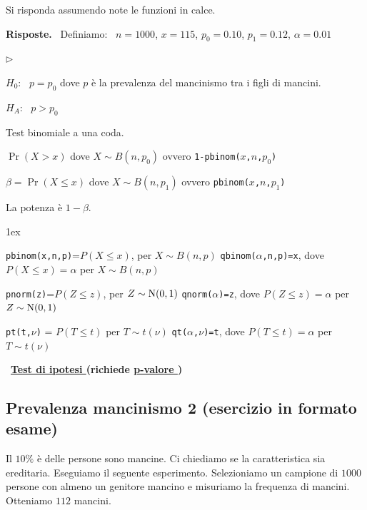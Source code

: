 \documentclass[11pt,openany]{book}
\newcommand{\mylabel}[1]{{\footnotesize\textsf{#1}}\hfill}
\renewenvironment{itemize}
  {\begin{list}{$\triangleright$}{%
   \setlength{\parskip}{0mm}
   \setlength{\topsep}{.2\baselineskip}
   \setlength{\rightmargin}{0mm}
   \setlength{\listparindent}{0mm}
   \setlength{\itemindent}{0mm}
   \setlength{\labelwidth}{3ex}
   \setlength{\itemsep}{.4\baselineskip}
   \setlength{\parsep}{0mm}
   \setlength{\partopsep}{0mm}
   \setlength{\labelsep}{1ex}
   \setlength{\leftmargin}{\labelwidth+\labelsep}
   \let\makelabel\mylabel}}{%
   \end{list}\vspace*{-1.3mm}}
\begin{document}
Si risponda assumendo note le funzioni in calce.

\textbf{Risposte.} \ Definiamo: \ $n=1000$,\hfil
$x=115$,\hfil
$p_0=0.10$,\hfil
$p_1=0.12$,\hfil
$\alpha=0.01$\hfil

\begin{itemize}
\item[1.] $H_0$: \ $p=p_0$ dove $p$ è la prevalenza del mancinismo tra i figli di mancini.
\item[2.] $H_A$: \ $p>p_0$ 
\item[3.] Test binomiale a una coda.
\item[4.] $\Pr(X> x)$ dove $X\sim B(n,p_0)$ ovvero {\tt 1-pbinom($x$,$n$,$p_0$)}
\item[5.] $\beta=\Pr(X\le x)$ dove $X\sim B(n,p_1)$ ovvero {\tt pbinom($x$,$n$,$p_1$)}
\item[6.]  La potenza è $1-\beta$.
\end{itemize}


\vfill
\parskip1ex
{\hrulefill\scriptsize

{\tt pbinom(x,n,p)}=$P(X\le x)$, per $X\sim B(n,p)$
\hfill 
{\tt qbinom($\alpha$,n,p)=x},  dove $P(X\le x)=\alpha$ per $X\sim B(n,p)$

{\tt pnorm(z)}=$P(Z\le z)$, per $Z\sim {\rm N}(0,1)$
\hfill 
{\tt qnorm($\alpha$)=z},  dove $P(Z\le z)=\alpha$ per $Z\sim {\rm N}(0,1)$

{\tt pt(t,$\nu$)} = $P(T\le t)$ per $T\sim t(\nu)$
\hfill
{\tt qt($\alpha$,$\nu$)=t}, dove $P(T\le t)=\alpha$ per $T\sim t(\nu)$

}

\clearpage\
\hfill\textbf{{\color{brown}\hyperref[test_ipotesi]{Test di ipotesi \faShare}} (richiede \hyperref[pvalore]{p-valore \faShare})} 
\subsection{Prevalenza mancinismo 2 (esercizio in formato esame)}
\label{Prevalenza mancinismo 2}

Il $10\%$ è delle persone sono mancine. Ci chiediamo se la caratteristica sia ereditaria. Eseguiamo il seguente esperimento. Selezioniamo un campione di $1000$ persone con almeno un genitore mancino e misuriamo la frequenza di mancini. Otteniamo $112$ mancini. 
\end{document}
